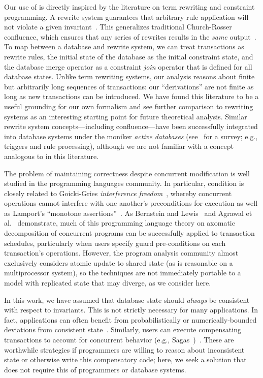  Our use of \iconfluence is directly inspired
by the literature on term rewriting and constraint programming. A
\iconfluent rewrite system guarantees that arbitrary rule application
will not violate a given invariant~\cite{obs-confluence}. This
generalizes traditional Church-Rosser confluence, which ensures that
any series of rewrites results in the \textit{same}
output~\cite{termrewriting}. To map between a database and rewrite
system, we can treat transactions as rewrite rules, the initial state
of the database as the initial constraint state, and the database
merge operator as a constraint \textit{join} operator that is defined
for all database states. Unlike term rewriting systems, our \cfreedom
analysis reasons about finite but arbitrarily long sequences of
transactions: our ``derivations'' are not finite as long as new
transactions can be introduced. We have found this literature to be a
useful grounding for our own formalism and see further comparison to
rewriting systems as an interesting starting point for future
theoretical analysis. Similar rewrite system concepts---including
confluence---have been successfully integrated into database systems
under the moniker \textit{active databases} (see~\cite{activedb-book}
for a survey; e.g., triggers and rule processing), although we are not
familiar with a concept analogous to \iconfluence in this literature.

 The problem of maintaining correctness
despite concurrent modification is well studied in the programming
languages community. In particular, \iconfluence condition is closely
related to Goicki-Gries \textit{interference
  freedom}~\cite{owickigries}, whereby concurrent operations cannot
interfere with one another's preconditions for execution as well as
Lamport's ``monotone assertions''~\cite{lamport-safety}. As
Bernstein and Lewis~\cite{decomp-semantics} and Agrawal et
al.~\cite{agarwal-consistency} demonstrate, much of this programming
language theory on axomatic decomposition of concurrent programs can
be successfully applied to transaction schedules, particularly when
users specify guard pre-conditions on each transaction's
operations. However, the program analysis community almost exclusively
considers atomic update to shared state (as is reasonable on a
multiprocessor system), so the techniques are not immediately portable
to a model with replicated state that may diverge, as we consider
here.

 In this work, we have assumed that
database state should \textit{always} be consistent with respect to
invariants. This is not strictly necessary for many applications. In
fact, applications can often benefit from probabilistically or
numerically-bounded deviations from consistent
state~\cite{epsilon-divergence}. Similarly, users can execute
compensating transactions to account for concurrent behavior (e.g.,
Sagas~\cite{sagas})~\cite{ic-survey,ic-survey-two}. These are worthwhile
strategies if programmers are willing to reason about inconsistent
state or otherwise write this compensatory code; here,
we seek a solution that does not require this of programmers or
database systems.

